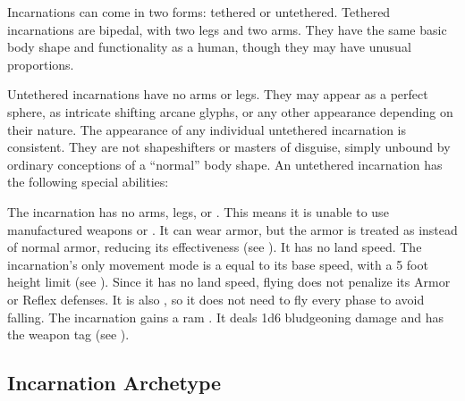     Incarnations can come in two forms: tethered or untethered.
    Tethered incarnations are bipedal, with two legs and two arms.
    They have the same basic body shape and functionality as a human, though they may have unusual proportions.

    Untethered incarnations have no arms or legs.
    They may appear as a perfect sphere, as intricate shifting arcane glyphs, or any other appearance depending on their nature.
    The appearance of any individual untethered incarnation is consistent.
    They are not shapeshifters or masters of disguise, simply unbound by ordinary conceptions of a ``normal'' body shape.
    An untethered incarnation has the following special abilities:
    \begin{raggeditemize}
         The incarnation has no arms, legs, or .
            This means it is unable to use manufactured weapons or .
            It can wear armor, but the armor is treated as  instead of normal armor, reducing its effectiveness (see ).
            It has no land speed.
         The incarnation's only movement mode is a  equal to its base speed, with a 5 foot height limit (see ).
            Since it has no land speed, flying does not penalize its Armor or Reflex defenses.
            It is also , so it does not need to fly every phase to avoid falling.
         The incarnation gains a ram .
            It deals 1d6 bludgeoning damage and has the  weapon tag (see ).
    \end{raggeditemize}

    \subsection{Incarnation Archetype}

